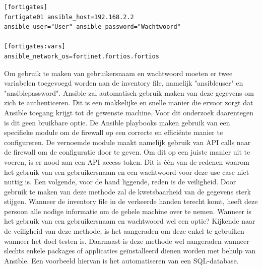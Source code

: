 \begin{lstlisting}[caption={inventory file with username and password}]
[fortigates]
fortigate01 ansible_host=192.168.2.2
ansible_user="User" ansible_password="Wachtwoord"

[fortigates:vars]
ansible_network_os=fortinet.fortios.fortios
\end{lstlisting}
Om gebruik te maken van gebruikersnaam en wachtwoord moeten er twee variabelen toegevoegd worden aan de inventory file, namelijk "ansible\textunderscore user" en "ansible\textunderscore password". Ansible zal automatisch gebruik maken van deze gegevens om zich te authenticeren. Dit is een makkelijke en snelle manier die ervoor zorgt dat Ansible toegang krijgt tot de gewenste machine. Voor dit onderzoek daarentegen is dit geen bruikbare optie. De Ansible playbooks maken gebruik van een specifieke module om de firewall op een correcte en efficiënte manier te configureren. De vernoemde module maakt namelijk gebruik van API calls naar de firewall om de configuratie door te geven. Om dit op een juiste manier uit te voeren, is er nood aan een API access token. Dit is één van de redenen waarom het gebruik van een gebruikersnaam en een wachtwoord voor deze use case niet nuttig is. Een volgende, voor de hand liggende, reden is de veiligheid. Door gebruik te maken van deze methode zal de kwetsbaarheid van de gegevens sterk stijgen. Wanneer de inventory file in de verkeerde handen terecht komt, heeft deze persoon alle nodige informatie om de gehele machine over te nemen.
Wanneer is het gebruik van een gebruikersnaam en wachtwoord wel een optie? Kijkende naar de veiligheid van deze methode, is het aangeraden om deze enkel te gebruiken wanneer het doel testen is. Daarnaast is deze methode wel aangeraden wanneer slechts enkele packages of applicaties geïnstalleerd dienen worden met behulp van Ansible. Een voorbeeld hiervan is het automatiseren van een SQL-database.

